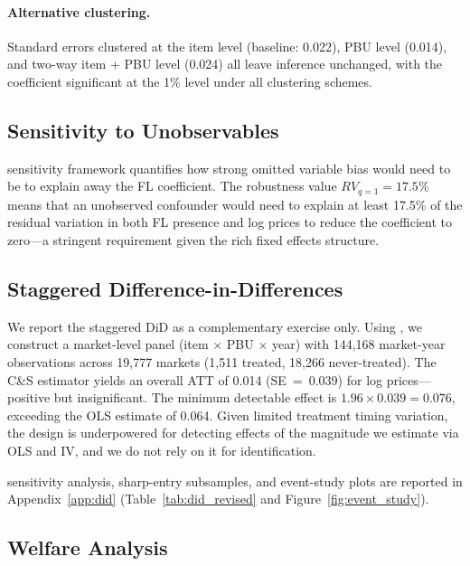 \paragraph{Alternative clustering.}
Standard errors clustered at the item level (baseline: 0.022), PBU level
(0.014), and two-way item + PBU level (0.024) all leave inference
unchanged, with the coefficient significant at the 1\% level under all
clustering schemes.

\subsection{Sensitivity to Unobservables}

\cites{cinelli2020making} sensitivity framework quantifies how strong
omitted variable bias would need to be to explain away the FL
coefficient. The robustness value $RV_{q=1} = 17.5\%$ means that an
unobserved confounder would need to explain at least 17.5\% of the
residual variation in both FL presence and log prices to reduce the
coefficient to zero---a stringent requirement given the rich fixed
effects structure.

\subsection{Staggered Difference-in-Differences}

We report the staggered DiD as a complementary exercise only. Using %
\citet{callaway2021difference}, we construct a market-level panel (item
$\times$ PBU $\times$ year) with 144,168 market-year observations across
19,777 markets (1,511 treated, 18,266 never-treated). The C\&S estimator
yields an overall ATT of 0.014 (SE~=~0.039) for log prices---positive
but insignificant. The minimum detectable effect is
$1.96 \times 0.039 = 0.076$, exceeding the OLS estimate of 0.064.
Given limited treatment timing variation, the design is underpowered for
detecting effects of the magnitude we estimate via OLS and IV, and we do
not rely on it for identification.

\cites{rambachan2023more} sensitivity analysis, sharp-entry subsamples,
and event-study plots are reported in Appendix~\ref{app:did}
(Table~\ref{tab:did_revised} and Figure~\ref{fig:event_study}).

\subsection{Welfare Analysis}
\label{sec:welfare}

